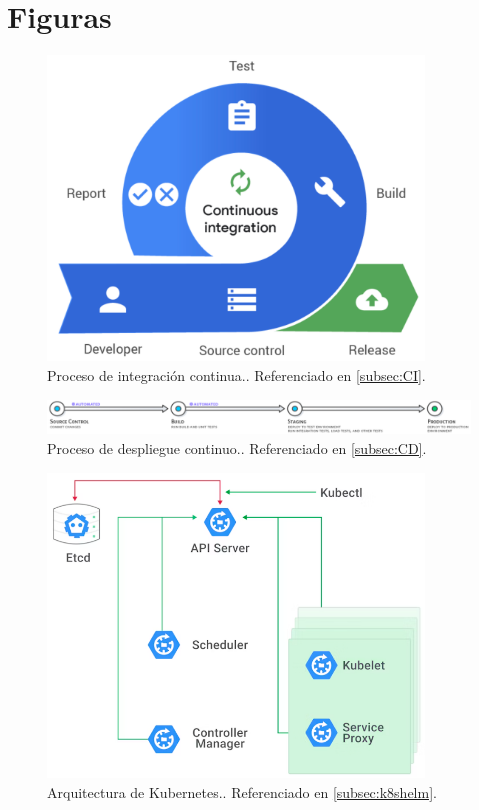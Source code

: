 \clearpage

\section{Figuras}

\begin{figure}[h]
  \centerline{\includegraphics[width=10cm]{figuras/ci}}
  \caption{Proceso de integración continua.\cite{img:ci}. Referenciado en \ref{subsec:CI}.}
  \label{fig:ci}
\end{figure}

\begin{figure}[h]
  \centerline{\includegraphics[width=17cm]{figuras/cd}}
  \caption{Proceso de despliegue continuo.\cite{img:cd}. Referenciado en \ref{subsec:CD}.}
  \label{fig:cd}
\end{figure}

\begin{figure}[h]
  \centerline{\includegraphics[width=10cm]{figuras/k8s}}
  \caption{Arquitectura de Kubernetes.\cite{img:k8s}. Referenciado en \ref{subsec:k8shelm}.}
  \label{fig:k8s}
\end{figure}

